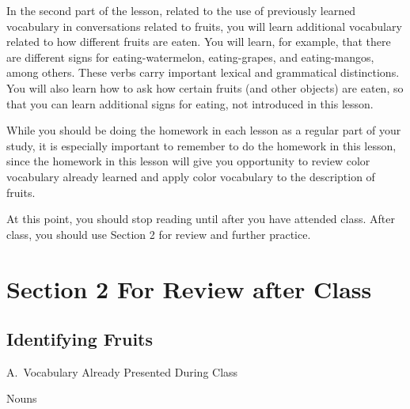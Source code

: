 \documentclass{tufte-book}
\begin{document}
In the second part of the lesson, related to the use of previously learned vocabulary in conversations related to fruits, you will learn additional vocabulary
related to how different fruits are eaten. You will learn, for example, that there are
different signs for eating-watermelon, eating-grapes, and eating-mangos, among
others. These verbs carry important lexical and grammatical distinctions. You will
also learn how to ask how certain fruits (and other objects) are eaten, so that you
can learn additional signs for eating, not introduced in this lesson.

While you should be doing the homework in each lesson as a regular part of
your study, it is especially important to remember to do the homework
in this lesson, since the homework in this lesson will give you opportunity to review
color vocabulary already learned and apply color vocabulary to the description of
fruits.

At this point, you should stop reading until after you have attended class.
After class, you should use Section 2 for review and further practice.
\newpage
\section{Section 2 For Review after Class}
\subsection{Identifying Fruits}

\noindent A.~Vocabulary Already Presented During Class

\vspace{0.25cm} \noindent Nouns
\end{document}

